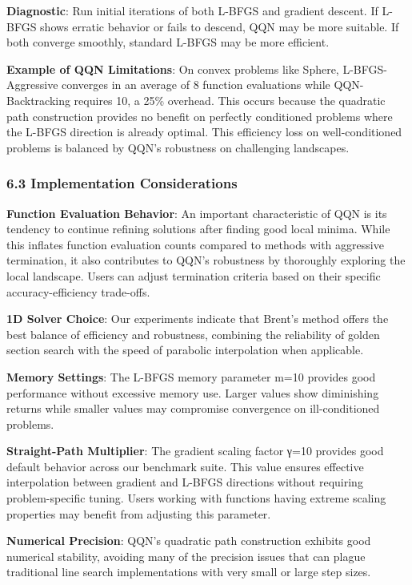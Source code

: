 \textbf{Diagnostic}: Run initial iterations of both L-BFGS and gradient descent. If L-BFGS shows erratic behavior or fails to descend, QQN may be more suitable. If both converge smoothly, standard L-BFGS may be more efficient.

\textbf{Example of QQN Limitations}: On convex problems like Sphere, L-BFGS-Aggressive converges in an average of 8 function evaluations while QQN-Backtracking requires 10, a 25\% overhead. This occurs because the quadratic path construction provides no benefit on perfectly conditioned problems where the L-BFGS direction is already optimal.
This efficiency loss on well-conditioned problems is balanced by QQN's robustness on challenging landscapes.

\hypertarget{implementation-considerations}{%
\subsubsection{6.3 Implementation Considerations}\label{implementation-considerations}}

\textbf{Function Evaluation Behavior}: An important characteristic of QQN is its tendency to continue refining solutions after finding good local minima. While this inflates function evaluation counts compared to methods with aggressive termination, it also contributes to QQN's robustness by thoroughly exploring the local landscape. Users can adjust termination criteria based on their specific accuracy-efficiency trade-offs.

\textbf{1D Solver Choice}: Our experiments indicate that Brent's method offers the best balance of efficiency and robustness, combining the reliability of golden section search with the speed of parabolic interpolation when applicable.

\textbf{Memory Settings}: The L-BFGS memory parameter m=10 provides good performance without excessive memory use. Larger values show diminishing returns while smaller values may compromise convergence on ill-conditioned problems.

\textbf{Straight-Path Multiplier}: The gradient scaling factor γ=10 provides good default behavior across our benchmark suite. This value ensures effective interpolation between gradient and L-BFGS directions without requiring problem-specific tuning. Users working with functions having extreme scaling properties may benefit from adjusting this parameter.

\textbf{Numerical Precision}: QQN's quadratic path construction exhibits good numerical stability, avoiding many of the precision issues that can plague traditional line search implementations with very small or large step sizes.

